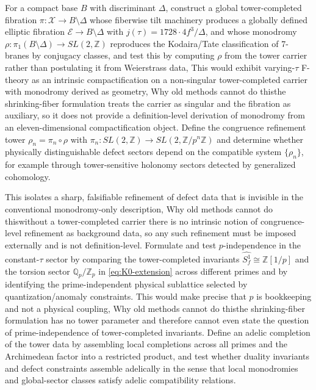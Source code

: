 \documentclass[11pt]{article}
\theoremstyle{remark}
\newcommand{\Z}{\mathbb{Z}}
\newcommand{\Q}{\mathbb{Q}}
\begin{document}
For a compact base \(B\) with discriminant \(\Delta\), construct a global tower-completed fibration \(\pi:\mathcal{X}\to B\setminus\Delta\) whose fiberwise tilt machinery produces a globally defined elliptic fibration \(\mathcal{E}\to B\setminus\Delta\) with \(j(\tau)=1728\cdot 4f^{3}/\Delta\), and whose monodromy \(\rho:\pi_{1}(B\setminus\Delta)\to SL(2,\Z)\) reproduces the Kodaira/Tate classification of 7-branes by conjugacy classes, and test this by computing \(\rho\) from the tower carrier rather than postulating it from Weierstrass data, This would exhibit varying-\(\tau\) F-theory as an intrinsic compactification on a non-singular tower-completed carrier with monodromy derived as geometry, Why old methods cannot do this\:the shrinking-fiber formulation treats the carrier as singular and the fibration as auxiliary, so it does not provide a definition-level derivation of monodromy from an eleven-dimensional compactification object. Define the congruence refinement tower \(\rho_n=\pi_n\circ\rho\) with \(\pi_n:SL(2,\Z)\to SL(2,\Z/p^{n}\Z)\) and determine whether physically distinguishable defect sectors depend on the compatible system \(\{\rho_n\}\), for example through tower-sensitive holonomy sectors detected by generalized cohomology.

This isolates a sharp, falsifiable refinement of defect data that is invisible in the conventional monodromy-only description, Why old methods cannot do this\:without a tower-completed carrier there is no intrinsic notion of congruence-level refinement as background data, so any such refinement must be imposed externally and is not definition-level. Formulate and test \(p\)-independence in the constant-\(\tau\) sector by comparing the tower-completed invariants \(\widehat{S_f^{1}}\cong \Z[1/p]\) and the torsion sector \(\Q_p/\Z_p\) in \eqref{eq:K0-extension} across different primes and by identifying the prime-independent physical sublattice selected by quantization/anomaly constraints. This would make precise that \(p\) is bookkeeping and not a physical coupling, Why old methods cannot do this\:the shrinking-fiber formulation has no tower parameter and therefore cannot even state the question of prime-independence of tower-completed invariants. Define an adelic completion of the tower data by assembling local completions across all primes and the Archimedean factor into a restricted product, and test whether duality invariants and defect constraints assemble adelically in the sense that local monodromies and global-sector classes satisfy adelic compatibility relations.
\end{document}
